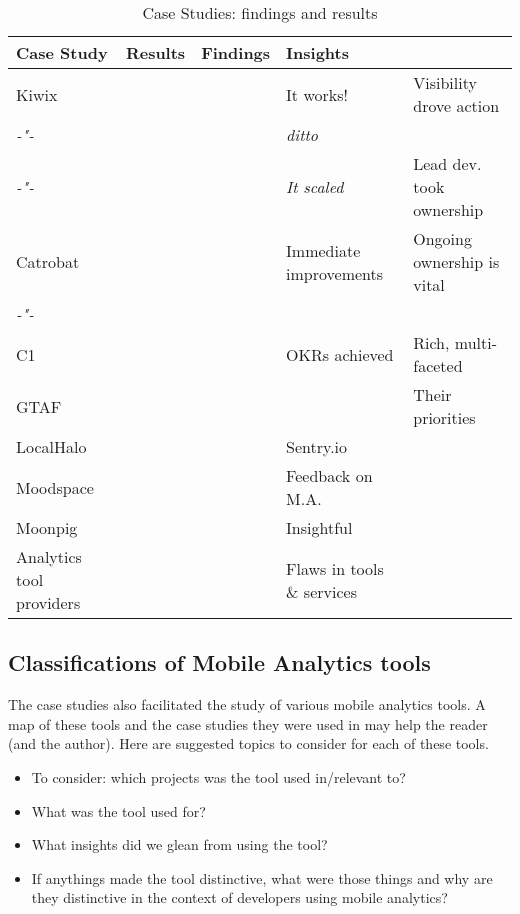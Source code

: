 \begin{table}
    \centering
    \tabcolsep=0.06cm
    \footnotesize
    \begin{tabular}{lllll}\toprule
    Case Study  & Results & Findings    & Insights & \\
    \midrule
    Kiwix                    &     & & It works! & Visibility drove action \\ 
     \textit{-"-}            &     & & \textit{ditto} & \\
     \textit{-"-}            &     & & \textit{It scaled} & Lead dev. took ownership \\
    Catrobat                 &        & & Immediate improvements & Ongoing ownership is vital \\
     \textit{-"-}            &     & & & \\
    C1                       &   & & OKRs achieved & Rich, multi-faceted \\
    GTAF                     &  & & & Their priorities  \\
    LocalHalo                &  & & Sentry.io \\
    Moodspace                &  & & Feedback on M.A. \\
    Moonpig                  &  & & Insightful \\
    Analytics tool providers &  & & Flaws in tools \& services\\
    \bottomrule
    \end{tabular}
    \caption{Case Studies: findings and results}
    \label{tab:case-studies-findings-and-results}
\end{table}


\subsection{Classifications of Mobile Analytics tools}
The case studies also facilitated the study of various mobile analytics tools. A map of these tools and the case studies they were used in may help the reader (and the author). Here are suggested topics to consider for each of these tools.
\begin{itemize}
    \itemsep0em
    \item To consider: which projects was the tool used in/relevant to?
    \item What was the tool used for?
    \item What insights did we glean from using the tool?
    \item If anythings made the tool distinctive, what were those things and why are they distinctive in the context of developers using mobile analytics?
\end{itemize}
